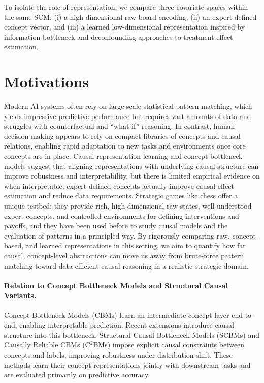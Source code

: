 \documentclass{article}
\begin{document}
To isolate the role of representation, we compare three covariate spaces within the
same SCM: (i) a high-dimensional raw board encoding, (ii) an expert-defined concept
vector, and (iii) a learned low-dimensional representation inspired by
information-bottleneck and deconfounding approaches to treatment-effect
estimation.\cite{kuang2020information,deconfoundingScores}

\section{Motivations}

Modern AI systems often rely on large-scale statistical pattern matching, which
yields impressive predictive performance but requires vast amounts of data and
struggles with counterfactual and ``what-if'' reasoning.\cite{lake2017building,reasoningAIMag}
In contrast, human decision-making appears to rely on compact libraries of concepts
and causal relations, enabling rapid adaptation to new tasks and environments once
core concepts are in place.\cite{lake2017building,towardHumanLevelConcept} Causal
representation learning and concept bottleneck models suggest that aligning
representations with underlying causal structure can improve robustness and
interpretability, but there is limited empirical evidence on when interpretable,
expert-defined concepts actually improve causal effect estimation and reduce data
requirements.\cite{scholkopf2021towards,koh2020concept,fromCausalToConcept}
Strategic games like chess offer a unique testbed: they provide rich,
high-dimensional raw states, well-understood expert concepts, and controlled
environments for defining interventions and payoffs, and they have been used before
to study causal models and the evaluation of patterns in a principled
way.\cite{lemeire2005causalmodelsinchess,fortressesPaper,causalMaskingSpatial}
By rigorously comparing raw, concept-based, and learned representations in this
setting, we aim to quantify how far causal, concept-level abstractions can move us
away from brute-force pattern matching toward data-efficient causal reasoning in a
realistic strategic domain.\cite{scholkopf2021towards,causalReasoningRL,fromCausalToConcept}

\paragraph{Relation to Concept Bottleneck Models and Structural Causal Variants.}
Concept Bottleneck Models (CBMs)\cite{koh2020concept} learn an intermediate concept
layer end-to-end, enabling interpretable prediction. Recent extensions introduce
causal structure into this bottleneck: Structural Causal Bottleneck Models
(SCBMs) and Causally Reliable CBMs (C$^2$BMs)\cite{fromCausalToConcept} impose
explicit causal constraints between concepts and labels, improving robustness under
distribution shift. These methods learn their concept representations jointly with
downstream tasks and are evaluated primarily on predictive accuracy.
\end{document}
